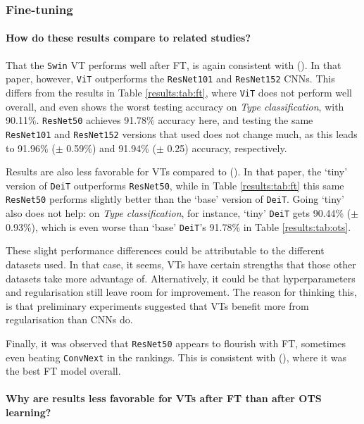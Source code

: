 \subsubsection{Fine-tuning} \label{exp:int:ft}

\paragraph{How do these results compare to related studies?}
That the \texttt{Swin} VT performs well after FT, is again consistent with \citeauthor{zhou2021convnets} (\citeyear{zhou2021convnets}). In that paper, however, \texttt{ViT} outperforms the \texttt{ResNet101} and \texttt{ResNet152} CNNs. This differs from the results in Table \ref{results:tab:ft}, where \texttt{ViT} does not perform well overall, and even shows the worst testing accuracy on \textit{Type classification}, with 90.11\%. \texttt{ResNet50} achieves 91.78\% accuracy here, and testing the same \texttt{ResNet101} and \texttt{ResNet152} versions that \citeauthor{zhou2021convnets} used does not change much, as this leads to 91.96\% ($\pm$ 0.59\%) and 91.94\% ($\pm$ 0.25) accuracy, respectively.

Results are also less favorable for VTs compared to \citeauthor{matsoukas2021time} (\citeyear{matsoukas2021time}). In that paper, the `tiny' version of \texttt{DeiT} outperforms \texttt{ResNet50}, while in Table \ref{results:tab:ft} this same \texttt{ResNet50} performs slightly better than the `base' version of \texttt{DeiT}. Going `tiny' also does not help: on \textit{Type classification}, for instance, `tiny' \texttt{DeiT} gets 90.44\% ($\pm$ 0.93\%), which is even worse than `base' \texttt{DeiT}'s 91.78\% in Table \ref{results:tab:ots}.

These slight performance differences could be attributable to the different datasets used. In that case, it seems, VTs have certain strengths that those other datasets take more advantage of. Alternatively, it could be that hyperparameters and regularisation still leave room for improvement. The reason for thinking this, is that preliminary experiments suggested that VTs benefit more from regularisation than CNNs do.

Finally, it was observed that \texttt{ResNet50} appears to flourish with FT, sometimes even beating \texttt{Conv\-Next} in the rankings. This is consistent with \citeauthor{sabatelli2018deep} (\citeyear{sabatelli2018deep}), where it was the best FT model overall.

\paragraph{Why are results less favorable for VTs after FT than after OTS learning?}


